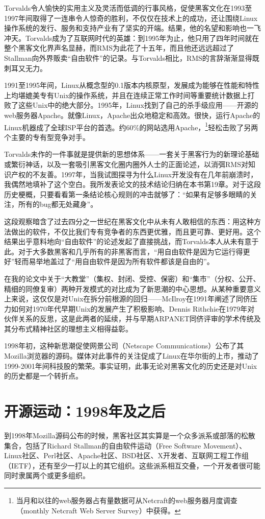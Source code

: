 \documentclass[12pt,oneside]{book}
\begin{document}
\begin{common-format}
Torvalds令人愉快的实用主义及灵活而低调的行事风格，促使黑客文化在1993至1997年间取得了一连串令人惊奇的胜利，不仅仅在技术上的成功，还让围绕Linux操作系统的发行、服务和支持产业有了坚实的开端。结果，他的名望和影响也一飞冲天。Torvalds成为了互联网时代的英雄：到1995年为止，他只用了四年时间就在整个黑客文化界声名显赫，而RMS为此花了十五年，而且他还远远超过了Stallman向外界贩卖“自由软件”的记录。与Torvalds相比，RMS的言辞渐渐显得既刺耳又无力。

1991至1995年间，Linux从概念型的0.1版本内核原型，发展成为能够在性能和特性上均堪媲美专有Unix的操作系统，并且在连续正常工作时间等重要统计数据上打败了这些Unix中的绝大部分。1995年，Linux找到了自己的杀手级应用——开源的web服务器Apache。就像Linux，Apache出众地稳定和高效。很快，运行Apache的Linux机器成了全球ISP平台的首选。约60\%{}的网站选用Apache，\footnote{当月和以往的web服务器占有量数据可从Netcraft的web服务器月度调查（monthly Netcraft Web Server Survey）中获得。}轻松击败了另两个主要的专有型竞争对手。

Torvalds未作的一件事就是提供新的思想体系——一套关于黑客行为的新理论基础或繁衍神话，以及一套吸引黑客文化圈内圈外人士的正面论述，以消弭RMS对知识产权的不友善。1997年，当我试图探寻为什么Linux开发没有在几年前崩溃时，我偶然地填补了这个空白。我所发表论文\cite{Raymond01}的技术结论归纳在本书第19章。对于这段历史梗概，只要看看第一条结论核心规则的冲击就够了：“如果有足够多眼睛的关注，所有的bug都无处藏身”。

这段观察暗含了过去四分之一世纪在黑客文化中从未有人敢相信的东西：用这种方法做出的软件，不仅比我们专有竞争者的东西更优雅，而且更可靠、更好用。这个结果出乎意料地向“自由软件”的论述发起了直接挑战，而Torvalds本人从未有意于此。对于大多数黑客和几乎所有的非黑客而言，“用自由软件是因为它运行得更好”轻而易举地盖过了“用自由软件是因为所有软件都该是自由的”。

在我的论文中关于“大教堂”（集权、封闭、受控、保密）和“集市”（分权、公开、精细的同僚复审）两种开发模式的对比成为了新思潮的中心思想。从某种重要意义上来说，这仅仅是对Unix在拆分前根源的回归——McIlroy在1991年阐述了同侪压力如何对1970年代早期Unix的发展产生了积极影响、Dennis Rithchie在1979年对伙伴关系的反思，这是此两者的延续，并与早期ARPANET同侪评审的学术传统及其分布式精神社区的理想主义相得益彰。

1998年初，这种新思潮促使网景公司（Netscape Communications）公布了其Mozilla浏览器的源码。媒体对此事件的关注促成了Linux在华尔街的上市，推动了1999-2001年间科技股的繁荣。事实证明，此事无论对黑客文化的历史还是对Unix的历史都是一个转折点。

\section{开源运动：1998年及之后}
到1998年Mozilla源码公布的时候，黑客社区其实算是一个众多派系或部落的松散集合，包括了Richard Stallman的自由软件运动（Free Software Movement）、Linux社区、Perl社区、Apache社区、BSD社区、X开发者、互联网工程工作组（IETF），还有至少一打以上的其它组织。这些派系相互交叠，一个开发者很可能同时隶属两个或更多组织。


\end{common-format}
\end{document}

